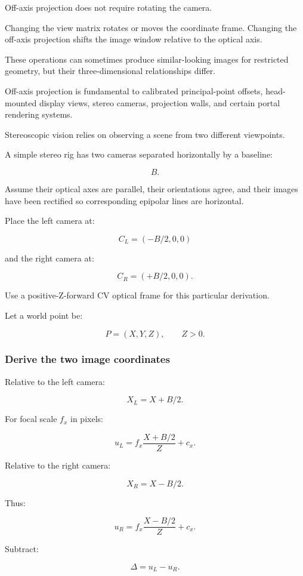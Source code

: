 Off-axis projection does not require rotating the camera.

Changing the view matrix rotates or moves the coordinate frame. Changing the off-axis projection shifts the image window relative to the optical axis.

These operations can sometimes produce similar-looking images for restricted geometry, but their three-dimensional relationships differ.

Off-axis projection is fundamental to calibrated principal-point offsets, head-mounted display views, stereo cameras, projection walls, and certain portal rendering systems.

Stereoscopic vision relies on observing a scene from two different viewpoints.

A simple stereo rig has two cameras separated horizontally by a baseline:

\[ \boxed{B}. \]

Assume their optical axes are parallel, their orientations agree, and their images have been rectified so corresponding epipolar lines are horizontal.

Place the left camera at:

\[ C_L=(-B/2,0,0) \]

and the right camera at:

\[ C_R=(+B/2,0,0). \]

Use a positive-Z-forward CV optical frame for this particular derivation.

Let a world point be:

\[ P=(X,Y,Z),\qquad Z>0. \]

\subsubsection{Derive the two image coordinates}\label{derive-the-two-image-coordinates}

Relative to the left camera:

\[ X_L=X+B/2. \]

For focal scale \(f_x\) in pixels:

\[ \boxed{ u_L=f_x\frac{X+B/2}{Z}+c_x. } \]

Relative to the right camera:

\[ X_R=X-B/2. \]

Thus:

\[ \boxed{ u_R=f_x\frac{X-B/2}{Z}+c_x. } \]

Subtract:

\[ \Delta=u_L-u_R. \]

